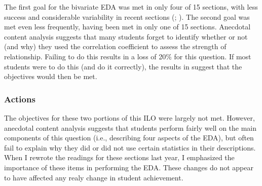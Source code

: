 \documentclass{article}\usepackage[]{graphicx}\usepackage[]{color}
\begin{document}
The first goal for the bivariate EDA was met in only four of 15 sections, with less success and considerable variability in recent sections (; ). The second goal was met even less frequently, having been met in only one of 15 sections. Anecdotal content analysis suggests that many students forget to identify whether or not (and why) they used the correlation coefficient to assess the strength of relationship. Failing to do this results in a loss of 20\% for this question. If most students were to do this (and do it correctly), the results in  suggest that the objectives would then be met.

\subsubsection{Actions}
\vspace{-12pt}
The objectives for these two portions of this ILO were largely not met. However, anecdotal content analysis suggests that students perform fairly well on the main components of this question (i.e., describing four aspects of the EDA), but often fail to explain why they did or did not use certain statistics in their descriptions. When I rewrote the readings for these sections last year, I emphasized the importance of these items in performing the EDA. These changes do not appear to have affected any realy change in student achievement.
\vspace{12pt}
\end{document}
